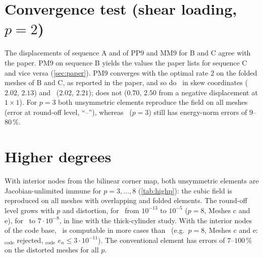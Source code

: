 \documentclass[10pt,a4paper]{article}
\begin{document}
\section{Convergence test (shear loading, $p=2$)}\label{sec:conv}
\begin{table}[h]
  \centering\small
  \caption{$u_y(A)$ for the sequences A, B, C (paper: Tables~17--19; exact $3.3125$).}
  \label{tab:conv}
  \resizebox{\linewidth}{!}{}

  \vspace{3mm}
  \caption{Least-squares rates of the energy-norm strain error, Eq.~(24) of the paper (paper:
    Fig.~15). \PP\ on folded meshes: the parametric strain is singular where $\det\bm J=0$, so the
    energy error of \PP\ is not well defined for B and C (here: signed $\det\bm J$).
    ``--'': error at round-off level (field reproduced).}
  \label{tab:rates}
  
\end{table}
The displacements of sequence A and of PP9 and MM9 for B and C agree with the paper. PM9 on
sequence B yields the values the paper lists for sequence C and vice versa (\cref{sec:paper}).
PM9 converges with the optimal rate $2$ on the folded meshes of B and C, as reported in the paper,
and so do \PM\ in skew coordinates ($2.02$, $2.13$) and \PH\ ($2.02$, $2.21$);  does not ($0.70$,
$2.50$ from a negative displacement at $1\times1$). For $p=3$ both unsymmetric elements reproduce
the field on all meshes (error at round-off level, ``--''), whereas \PP\ ($p=3$) still has
energy-norm errors of $9$--$80\,\%$.

\section{Higher degrees}\label{sec:highp}
\begin{table}[h]
  \centering\small
  \caption{Shear loading on Meshes a--f: relative nodal error $e_n$ for $p=3,\dots,8$ (cubic
    field, contained in the \PM\ trial space for $p\ge3$). \PM: interior nodes from the bilinear
    corner map; \PM$_\mathrm{code}$: interior nodes of \texttt{pSpectralElement\_NodesTopology};
    ``err.'': the code base stops (coincident nodes or singular metric interpolation).}
  \label{tab:highp}
  
\end{table}
With interior nodes from the bilinear corner map, both unsymmetric elements are
Jacobian-unlimited immune for $p=3,\dots,8$ (\cref{tab:highp}): the cubic field is reproduced on
all meshes with overlapping and folded elements. The round-off level grows with $p$ and
distortion, for \PM\ from $10^{-13}$ to $10^{-5}$ ($p=8$, Meshes c and e), for \PH\ to $7\cdot10^{-8}$,
in line with the thick-cylinder study. With the interior nodes of the code base, \PH\ is
computable in more cases than \PM\ (e.g.\ $p=8$, Meshes c and e: \PM$_\mathrm{code}$ rejected,
\PH$_\mathrm{code}$ $e_n\le3\cdot10^{-11}$). The conventional element has errors of $7$--$100\,\%$ on
the distorted meshes for all $p$.
\end{document}
